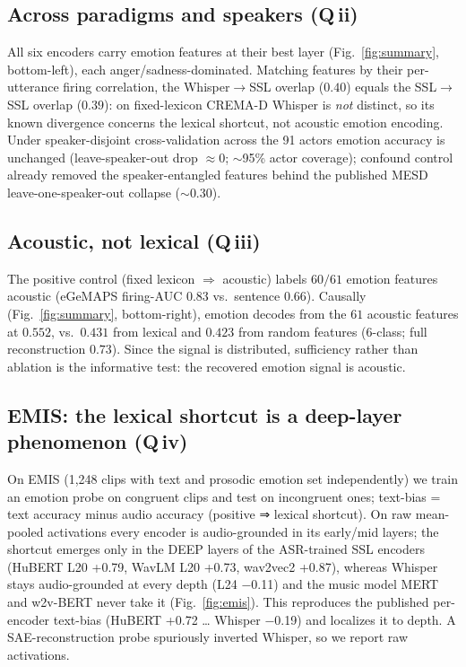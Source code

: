 \documentclass[sigconf,anonymous,nonacm]{acmart}
\begin{document}
\subsection{Across paradigms and speakers (Q\,ii)}
All six encoders carry emotion features at their best layer (Fig.~\ref{fig:summary}, bottom-left), each anger/sadness-dominated. Matching features by their per-utterance firing correlation, the Whisper$\rightarrow$SSL overlap ($0.40$) equals the SSL$\rightarrow$SSL overlap ($0.39$): on fixed-lexicon CREMA-D Whisper is \emph{not} distinct, so its known divergence concerns the lexical shortcut, not acoustic emotion encoding. Under speaker-disjoint cross-validation across the 91 actors emotion accuracy is unchanged (leave-speaker-out drop $\approx0$; $\sim$95\% actor coverage); confound control already removed the speaker-entangled features behind the published MESD leave-one-speaker-out collapse ($\sim$0.30).

\subsection{Acoustic, not lexical (Q\,iii)}
The positive control (fixed lexicon $\Rightarrow$ acoustic) labels $60/61$ emotion features acoustic (eGeMAPS firing-AUC $0.83$ vs.\ sentence $0.66$). Causally (Fig.~\ref{fig:summary}, bottom-right), emotion decodes from the $61$ acoustic features at $0.552$, vs.\ $0.431$ from lexical and $0.423$ from random features (6-class; full reconstruction $0.73$). Since the signal is distributed, sufficiency rather than ablation is the informative test: the recovered emotion signal is acoustic.

\subsection{EMIS: the lexical shortcut is a deep-layer phenomenon (Q\,iv)}
On EMIS (1,248 clips with text and prosodic emotion set independently) we train an emotion probe on congruent clips and test on incongruent ones; text-bias = text accuracy minus audio accuracy (positive ⇒ lexical shortcut). On raw mean-pooled activations every encoder is audio-grounded in its early/mid layers; the shortcut emerges only in the DEEP layers of the ASR-trained SSL encoders (HuBERT L20 +0.79, WavLM L20 +0.73, wav2vec2 +0.87), whereas Whisper stays audio-grounded at every depth (L24 −0.11) and the music model MERT and w2v-BERT never take it (Fig.~\ref{fig:emis}). This reproduces the published per-encoder text-bias (HuBERT +0.72 … Whisper −0.19) and localizes it to depth. A SAE-reconstruction probe spuriously inverted Whisper, so we report raw activations.
\end{document}
